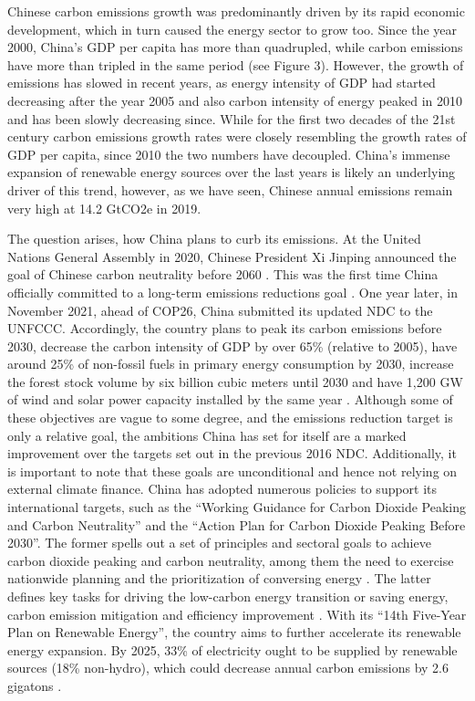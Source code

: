 \documentclass[
  12pt,
]{article}
\numberwithin{equation}{section}
\numberwithin{table}{section}
\numberwithin{figure}{section}
\begin{document}
Chinese carbon emissions growth was predominantly driven by its rapid
economic development, which in turn caused the energy sector to grow
too. Since the year 2000, China's GDP per capita has more than
quadrupled, while carbon emissions have more than tripled in the same
period (see Figure 3). However, the growth of emissions has slowed in
recent years, as energy intensity of GDP had started decreasing after
the year 2005 and also carbon intensity of energy peaked in 2010 and has
been slowly decreasing since. While for the first two decades of the
21st century carbon emissions growth rates were closely resembling the
growth rates of GDP per capita, since 2010 the two numbers have
decoupled. China's immense expansion of renewable energy sources over
the last years is likely an underlying driver of this trend, however, as
we have seen, Chinese annual emissions remain very high at 14.2 GtCO2e
in 2019.

The question arises, how China plans to curb its emissions. At the
United Nations General Assembly in 2020, Chinese President Xi Jinping
announced the goal of Chinese carbon neutrality before 2060
\citep{Jinping2020}. This was the first time China officially committed
to a long-term emissions reductions goal \citep{CAT2022}. One year
later, in November 2021, ahead of COP26, China submitted its updated NDC
to the UNFCCC. Accordingly, the country plans to peak its carbon
emissions before 2030, decrease the carbon intensity of GDP by over 65\%
(relative to 2005), have around 25\% of non-fossil fuels in primary
energy consumption by 2030, increase the forest stock volume by six
billion cubic meters until 2030 and have 1,200 GW of wind and solar
power capacity installed by the same year \citep{China2022}. Although
some of these objectives are vague to some degree, and the emissions
reduction target is only a relative goal, the ambitions China has set
for itself are a marked improvement over the targets set out in the
previous 2016 NDC. Additionally, it is important to note that these
goals are unconditional and hence not relying on external climate
finance. China has adopted numerous policies to support its
international targets, such as the ``Working Guidance for Carbon Dioxide
Peaking and Carbon Neutrality'' and the ``Action Plan for Carbon Dioxide
Peaking Before 2030''. The former spells out a set of principles and
sectoral goals to achieve carbon dioxide peaking and carbon neutrality,
among them the need to exercise nationwide planning and the
prioritization of conversing energy \citep{DRCEP2021a}. The latter
defines key tasks for driving the low-carbon energy transition or saving
energy, carbon emission mitigation and efficiency improvement
\citep{DRCEP2021b}. With its ``14th Five-Year Plan on Renewable
Energy'', the country aims to further accelerate its renewable energy
expansion. By 2025, 33\% of electricity ought to be supplied by
renewable sources (18\% non-hydro), which could decrease annual carbon
emissions by 2.6 gigatons \citep{Zhou2022}.
\end{document}
